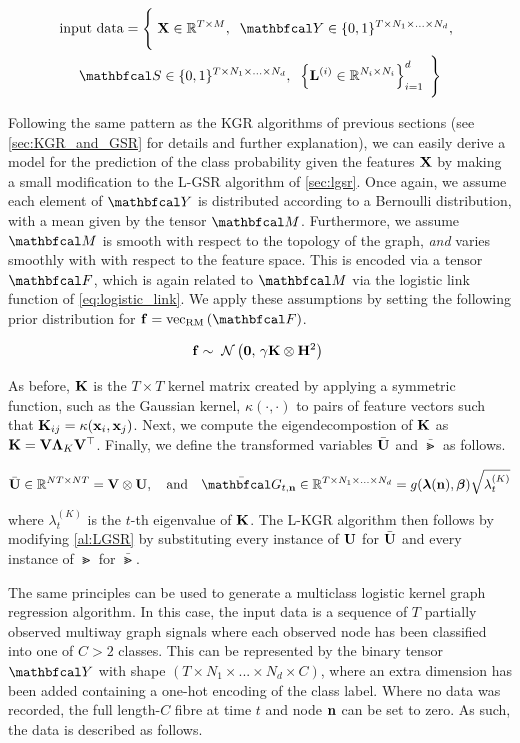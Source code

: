 \begin{multline*}
    \text{input data} = \Bigg\{\;\X \in \R^{T \times M}, \;\; \Yt \in \{0, 1\}^{T \times N_1 \times ... \times N_d}, \;\; \\ 
    \St \in \{0, 1\}^{T \times N_1 \times ... \times N_d} , \;\; \left\{\LL^{(i)} \in \R^{N_i \times N_i}\right\}_{i=1}^d \; \Bigg\}
\end{multline*}

Following the same pattern as the KGR algorithms of previous sections (see \cref{sec:KGR_and_GSR} for details and further explanation), we can easily derive a model for the prediction of the class probability given the features $\mathbf{X}$ by making a small modification to the L-GSR algorithm of \cref{sec:lgsr}. Once again, we assume each element of $\Yt$ is distributed according to a Bernoulli distribution, with a mean given by the tensor $\Mt$. Furthermore, we assume $\Mt$ is smooth with respect to the topology of the graph, \textit{and} varies smoothly with with respect to the feature space. This is encoded via a tensor $\Ft$, which is again related to $\Mt$ via the logistic link function of \cref{eq:logistic_link}. We apply these assumptions by setting the following prior distribution for $\f = \vecrm{\Ft}$. 

\begin{equation}
    \mathbf{f} \sim \; \mathcal{N}\left(\mathbf{0}, \, \gamma \mathbf{K} \otimes \mathbf{H}^2\right) \;
\end{equation}


As before, $\mathbf{K}$ is the $T \times T$ kernel matrix created by applying a symmetric function, such as the Gaussian kernel, $\kappa(\cdot, \cdot)$ to pairs of feature vectors such that $\mathbf{K}_{ij} = \kappa(\mathbf{x}_i, \mathbf{x}_j)$. Next, we compute the eigendecompostion of $\mathbf{K}$ as $\mathbf{K} = \mathbf{V} \mathbf{\Lambda}_K \mathbf{V}^\top$. Finally, we define the transformed variables $\bar{\mathbf{U}}$ and $\bar{\Gt}$ as follows. 

\begin{equation}
    \bar{\U} \in \R^{NT \times NT} = \V \otimes \U, \aand \bar{\Gt}_{t, \nn} \in \R^{T \times N_1 \times ... \times N_d} = g(\lambdaa(\nn), \betaa) \sqrt{\lambda_t^{(K)}}
\end{equation}

where $\lambda_t^{(K)}$ is the $t$-th eigenvalue of $\mathbf{K}$. The L-KGR algorithm then follows by modifying \cref{al:LGSR} by substituting every instance of $\mathbf{U}$ for $\bar{\mathbf{U}}$ and every instance of $\Gt$ for $\bar{\Gt}$. 

The same principles can be used to generate a multiclass logistic kernel graph regression algorithm. In this case, the input data is a sequence of $T $ partially observed multiway graph signals where each observed node has been classified into one of $C > 2$ classes. This can be represented by the binary tensor $\Yt$ with shape $(T \times N_1 \times ... \times N_d \times C)$, where an extra dimension has been added containing a one-hot encoding of the class label. Where no data was recorded, the full length-$C$ fibre at time $t$ and node $\mathbf{n}$ can be set to zero. As such, the data is described as follows. 

